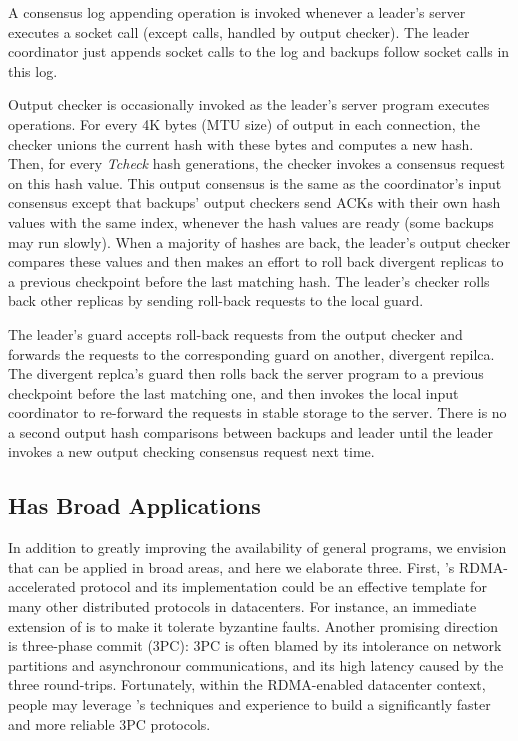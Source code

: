 A consensus log appending operation is invoked whenever a leader's server 
executes a socket call (except \send calls, handled by output checker). The 
leader coordinator just appends socket calls to the log and backups follow 
socket calls in this log.

Output checker is occasionally invoked as the leader's server program executes 
\send operations. For every 4K bytes (MTU size) of output in each connection, 
the checker unions the current hash with these bytes and computes a new hash. 
Then, for every \emph{Tcheck} hash generations, the checker invokes a consensus 
request on this hash value. This output consensus is the same as the 
coordinator's input consensus except that backups' output checkers send ACKs 
with their own hash values with the same index, whenever the hash values are 
ready (some backups may run slowly). When a majority of hashes are back, the 
leader's output checker compares these values and then makes an effort to roll 
back divergent replicas to a previous checkpoint before the last matching hash. 
The leader's checker rolls back other replicas by sending roll-back requests to 
the local guard.

The leader's guard accepts roll-back requests from the output checker and 
forwards the requests to the corresponding guard on another, divergent repilca. 
The divergent replca's guard then rolls back the server program to a previous 
checkpoint before the last matching one, and then invokes the local input 
coordinator to re-forward the requests in stable storage to the server. There 
is no a second output hash comparisons between backups and leader until the 
leader invokes a new output checking consensus request next time.


\subsection{\xxx Has Broad Applications}\label{sec:apps}

In addition to greatly improving the availability of general programs, we 
envision that \xxx can be applied in broad areas, and here we elaborate three. 
First, \xxx's RDMA-accelerated \paxos protocol and its implementation could be 
an effective template for many other distributed protocols in datacenters. For 
instance, an immediate extension of \xxx is to make it tolerate byzantine 
faults. Another promising direction is three-phase commit (3PC): 3PC is often 
blamed by its intolerance on network partitions and asynchronour communications, 
and its high latency caused by the three round-trips. Fortunately, within the 
RDMA-enabled datacenter context, people may leverage \xxx's techniques and 
experience to build a significantly faster and more reliable 3PC protocols.

